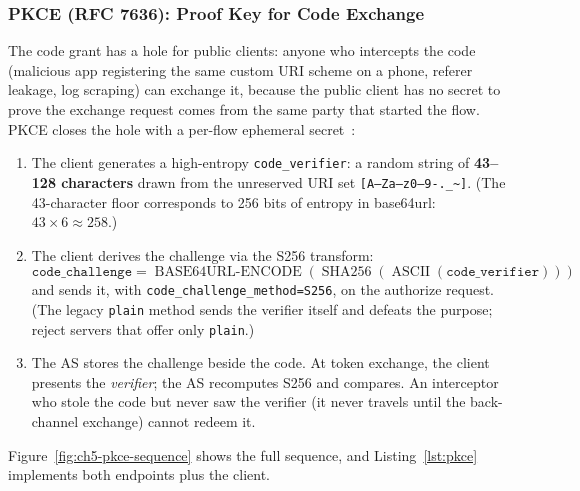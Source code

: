 \subsubsection{PKCE (RFC 7636): Proof Key for Code Exchange}

The code grant has a hole for public clients: anyone who intercepts the code
(malicious app registering the same custom URI scheme on a phone, referer
leakage, log scraping) can exchange it, because the public client has no
secret to prove the exchange request comes from the same party that started
the flow. PKCE closes the hole with a per-flow ephemeral
secret~\cite{rfc7636}:

\begin{enumerate}
  \item The client generates a high-entropy \texttt{code\_verifier}: a
        random string of \textbf{43--128 characters} drawn from the
        unreserved URI set \texttt{[A--Za--z0--9-.\_\textasciitilde{}]}.
        (The 43-character floor corresponds to 256 bits of entropy in
        base64url: $43 \times 6 \approx 258$.)
  \item The client derives the challenge via the S256 transform:
        \[
          \texttt{code\_challenge} = \operatorname{BASE64URL\text{-}ENCODE}\!\left(\operatorname{SHA256}\!\left(\operatorname{ASCII}(\texttt{code\_verifier})\right)\right)
        \]
        and sends it, with \texttt{code\_challenge\_method=S256}, on the
        authorize request. (The legacy \texttt{plain} method sends the
        verifier itself and defeats the purpose; reject servers that offer
        only \texttt{plain}.)
  \item The AS stores the challenge beside the code. At token exchange, the
        client presents the \emph{verifier}; the AS recomputes S256 and
        compares. An interceptor who stole the code but never saw the
        verifier (it never travels until the back-channel exchange) cannot
        redeem it.
\end{enumerate}

Figure~\ref{fig:ch5-pkce-sequence} shows the full sequence, and
Listing~\ref{lst:pkce} implements both endpoints plus the client.


